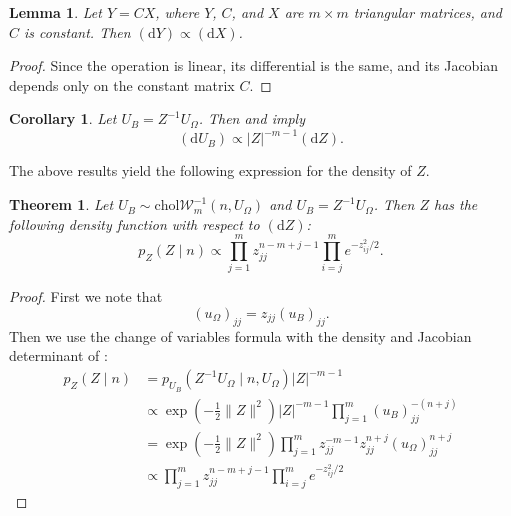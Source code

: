 \documentclass[12pt,a4paper,reqno]{amsart}
\numberwithin{equation}{section}
\newtheorem{theorem}{Theorem}[section]
\newtheorem{lemma}{Lemma}[section]
\newtheorem{corollary}{Corollary}[section]
\newcommand{\cholinvwishart}[1]{\mathrm{chol}\mathcal{W}^{-1}_{#1}}
\renewcommand{\det}[1]{\left| {#1} \right|}
\newcommand{\dmeasure}[1]{\left(\dd{#1}\right)}
\newcommand{\dd}[1]{\mathrm{d}{#1}}
\begin{document}
\begin{lemma}\label{trimuldetjac}
    Let $Y = C X$, where $Y$, $C$, and $X$ are $m \times m$ triangular matrices, and $C$ is constant.
    Then $\dmeasure{Y} \propto \dmeasure{X}$.
\end{lemma}
\begin{proof}
    Since the operation is linear, its differential is the same, and its Jacobian depends only on the constant matrix $C$.
\end{proof}

\begin{corollary}
    Let $U_B = Z^{-1} U_\Omega$.
    Then  and  imply
    \begin{equation}\label{ldivdetjac}
        \dmeasure{U_B} \propto \det{Z}^{-m-1} \dmeasure{Z}.
    \end{equation}
\end{corollary}

The above results yield the following expression for the density of $Z$.

\begin{theorem}
    Let $U_B \sim \cholinvwishart{m}(n, U_\Omega)$ and $U_B = Z^{-1} U_\Omega$.
    Then $Z$ has the following density function with respect to $\dmeasure{Z}$:
    \begin{equation}\label{invwishartbartlett}
        p_Z(Z \mid n) \propto \prod_{j=1}^m z_{jj}^{n-m+j-1} \prod_{i=j}^m e^{-z_{ij}^2/2}.
    \end{equation}
\end{theorem}
\begin{proof}
    First we note that
    \[
        (u_\Omega)_{jj} = z_{jj} (u_B)_{jj}.
    \]
    Then we use the change of variables formula with the density  and Jacobian determinant of :
    \begin{align*}
        p_Z(Z \mid n) & = p_{U_B}(Z^{-1} U_\Omega \mid n, U_\Omega) \det{Z}^{-m-1}                                                      \\
                      & \propto \exp\left(-\frac{1}{2}\lVert Z \rVert^2\right) \det{Z}^{-m-1} \prod_{j=1}^m (u_B)_{jj}^{-(n+j)}         \\
                      & = \exp\left(-\frac{1}{2}\lVert Z \rVert^2\right) \prod_{j=1}^m z_{jj}^{-m-1} z_{jj}^{n+j} (u_\Omega)_{jj}^{n+j} \\
                      & \propto \prod_{j=1}^m z_{jj}^{n-m+j-1} \prod_{i=j}^m e^{-z_{ij}^2/2}
    \end{align*}
\end{proof}
\end{document}
